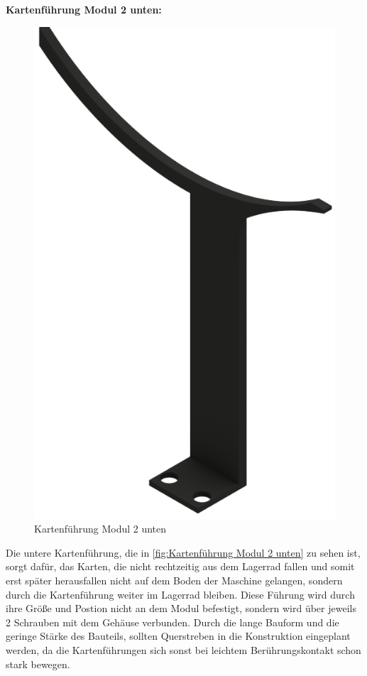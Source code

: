 \textbf{Kartenführung Modul 2 unten:}

\begin{figure}[H]
    \centering
    \includegraphics[width=6 cm]{fig/mech/FuehrungPLAUntenRechts}
    \caption{Kartenführung Modul 2 unten}
    \label{fig:Kartenführung Modul 2 unten}
\end{figure}

Die untere Kartenführung, die in \autoref{fig:Kartenführung Modul 2 unten} zu sehen ist, sorgt dafür, das Karten, die nicht rechtzeitig aus dem Lagerrad fallen und somit erst später
herausfallen nicht auf dem Boden der Maschine gelangen, sondern durch die Kartenführung weiter im Lagerrad bleiben. Diese Führung
wird durch ihre Größe und Postion nicht an dem Modul befestigt, sondern wird über jeweils 2 Schrauben mit dem Gehäuse
verbunden. Durch die lange Bauform und die geringe Stärke des Bauteils, sollten Querstreben in die Konstruktion eingeplant werden,
da die Kartenführungen sich sonst bei leichtem Berührungskontakt schon stark bewegen.

\pagebreak
